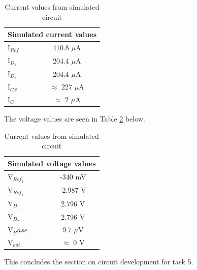 \begin{table}[H]
	\centering
	\caption{Current values from simulated circuit}
	\label{tab:simcircuitcurrent}
	\begin{tabular}{|l|c|}
		\hline
		\multicolumn{2}{|l|}{Simulated current values}                            \\ \hline
		I$_{Ref}$ & 410.8 $\mu$A                                                  \\ \hline
		I$_{D_1}$ & 204.4 $\mu$A                                                  \\ \hline
		I$_{D_2}$ & 204.4 $\mu$A                                                  \\ \hline
		I$_{CS}$  & $\approx$  227 $\mu$A                                         \\ \hline
		I$_{C}$   & $\approx$ 2  $\mu$A										 \\	\hline

	\end{tabular}
\end{table}

The voltage values are seen in Table \ref{tab:simcircuitvoltage} below. 

\begin{table}[H]
	\centering
	\caption{Current values from simulated circuit}
	\label{tab:simcircuitvoltage}
	\begin{tabular}{|l|c|}
		\hline
		\multicolumn{2}{|l|}{Simulated voltage values}                            \\ \hline
		V$_{Ref_2}$ & -340 mV                                                  \\ \hline
		V$_{Ref_1}$ & -2.987 V                                                 \\ \hline
		V$_{D_1}$ & 2.796 V                                                  \\ \hline
		V$_{D_2}$  & 2.796 V                                      \\ \hline
		V$_Base$   & 9.7 $\mu$V										 \\	\hline
		V$_{out}$ & $\approx$ 0 V \\ \hline
	\end{tabular}
\end{table}

This concludes the section on circuit development for task 5. 


